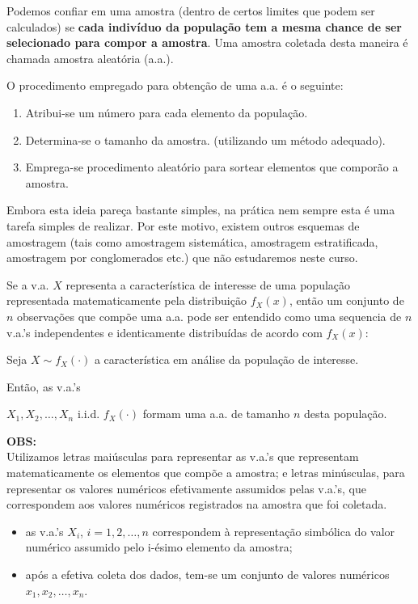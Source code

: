 \documentclass[
]{book}
\providecommand{\tightlist}{%
  \setlength{\itemsep}{0pt}\setlength{\parskip}{0pt}}
\theoremstyle{definition}
\theoremstyle{definition}
\theoremstyle{definition}
\theoremstyle{remark}
\begin{document}
Podemos confiar em uma amostra (dentro de certos limites que podem ser calculados) se \textbf{cada indivíduo da população tem a mesma chance de ser selecionado para compor a amostra}. Uma amostra coletada desta maneira é chamada amostra aleatória (a.a.).

O procedimento empregado para obtenção de uma a.a. é o seguinte:

\begin{enumerate}
\def\labelenumi{\arabic{enumi}.}
\tightlist
\item
  Atribui-se um número para cada elemento da população.
\item
  Determina-se o tamanho da amostra. (utilizando um método adequado).\\
\item
  Emprega-se procedimento aleatório para sortear elementos que comporão a amostra.
\end{enumerate}

Embora esta ideia pareça bastante simples, na prática nem sempre esta é uma tarefa simples de realizar. Por este motivo, existem outros esquemas de amostragem (tais como amostragem sistemática, amostragem estratificada, amostragem por conglomerados etc.) que não estudaremos neste curso.

Se a v.a. \(X\) representa a característica de interesse de uma população representada matematicamente pela distribuição \(f_X(x)\), então um conjunto de \(n\) observações que compõe uma a.a. pode ser entendido como uma sequencia de \(n\) v.a.'s independentes e identicamente distribuídas de acordo com \(f_X(x)\):

Seja \(X \sim f_X(\cdot)\) a característica em análise da população de interesse.

Então, as v.a.'s

\(X_1, X_2, \ldots, X_n\) i.i.d. \(f_X(\cdot)\) formam uma a.a. de tamanho \(n\) desta população.

\textbf{OBS:}\\
Utilizamos letras maiúsculas para representar as v.a.'s que representam matematicamente os elementos que compõe a amostra; e letras minúsculas, para representar os valores numéricos efetivamente assumidos pelas v.a.'s, que correspondem aos valores numéricos registrados na amostra que foi coletada.

\begin{itemize}
\tightlist
\item
  as v.a.'s \(X_i\), \(i =1, 2, \ldots, n\) correspondem à representação simbólica do valor numérico assumido pelo i-ésimo elemento da amostra;\\
\item
  após a efetiva coleta dos dados, tem-se um conjunto de valores numéricos \(x_1, x_2, \ldots, x_n\).
\end{itemize}
\end{document}
